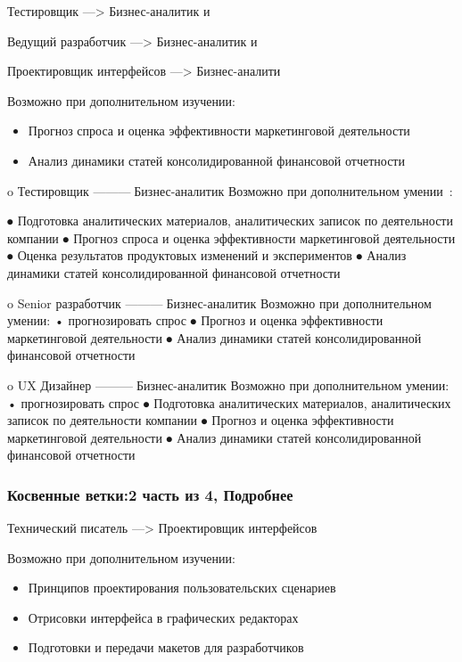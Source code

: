 \documentclass{../industrial-development}
\begin{document}
{\begin{frame}
\begin{block}{Тестировщик ---> Бизнес-аналитик  и

Ведущий разработчик ---> Бизнес-аналитик  и

Проектировщик интерфейсов ---> Бизнес-аналити}
Возможно при дополнительном изучении:
  \end{block}
\begin{itemize}
   аналитических материалов, аналитических записок по деятельности компании
  \item Прогноз спроса и оценка эффективности маркетинговой деятельности
\item Анализ динамики статей консолидированной финансовой отчетности
  \end{itemize}
\end{frame}

\lecturenotes
o	Тестировщик ---------Бизнес-аналитик
Возможно при дополнительном умении~\cite{rab}:

⦁ Подготовка аналитических материалов, аналитических записок по деятельности компании
⦁ Прогноз спроса и оценка эффективности маркетинговой деятельности
⦁ Оценка результатов продуктовых изменений и экспериментов
⦁ Анализ динамики статей консолидированной финансовой отчетности

o	Senior разработчик ---------Бизнес-аналитик
Возможно при дополнительном умении:
•	прогнозировать спрос 
⦁ Прогноз и оценка эффективности маркетинговой деятельности
⦁ Анализ динамики статей консолидированной финансовой отчетности

o	UX Дизайнер ---------Бизнес-аналитик
Возможно при дополнительном умении:
•	прогнозировать спрос 
⦁ Подготовка аналитических материалов, аналитических записок по деятельности компании
⦁ Прогноз и оценка эффективности маркетинговой деятельности
⦁ Анализ динамики статей консолидированной финансовой отчетности





\begin{frame} \frametitle{Косвенные ветки:2 часть из 4, Подробнее}

\begin{block}{Технический писатель ---> Проектировщик интерфейсов}

Возможно при дополнительном изучении:
  \end{block}
\begin{itemize}
  \item Принципов проектирования пользовательских сценариев
  \item Отрисовки интерфейса в графических редакторах
\item Подготовки и передачи макетов для разработчиков
  \end{itemize}


\end{frame}}
\end{document}
